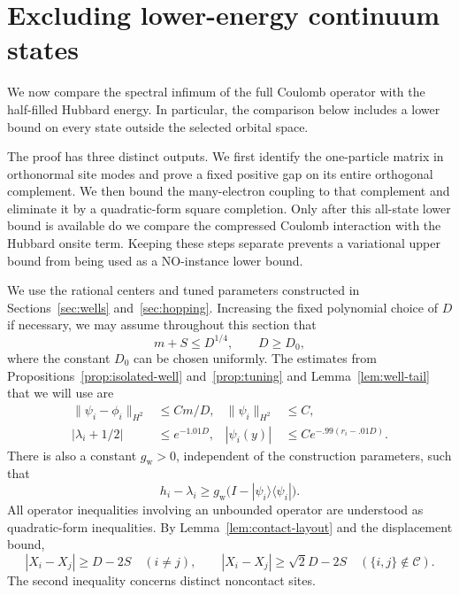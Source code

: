 \section{Excluding lower-energy continuum states}
\label{sec:continuum}

We now compare the spectral infimum of the full Coulomb operator with
the half-filled Hubbard energy.  In particular, the comparison below
includes a lower bound on every state outside the selected orbital
space.

The proof has three distinct outputs. We first identify the one-particle
matrix in orthonormal site modes and prove a fixed positive gap on its
entire orthogonal complement. We then bound the many-electron coupling
to that complement and eliminate it by a quadratic-form square completion.
Only after this all-state lower bound is available do we compare the
compressed Coulomb interaction with the Hubbard onsite term. Keeping
these steps separate prevents a variational upper bound from being used
as a NO-instance lower bound.

We use the rational centers and tuned parameters constructed in
Sections~\ref{sec:wells} and~\ref{sec:hopping}.  Increasing the fixed
polynomial choice of \(D\) if necessary, we may assume throughout this
section that
\[
 m+S\le D^{1/4},\qquad D\ge D_0,
\]
where the constant \(D_0\) can be chosen uniformly.  The estimates from
Propositions~\ref{prop:isolated-well} and~\ref{prop:tuning} and
Lemma~\ref{lem:well-tail} that we will use are
\begin{align}
 \|\psi_i-\phi_i\|_{H^2}&\le C m/D,
 &\|\psi_i\|_{H^2}&\le C, \label{eq:continuum-orbital-input}\\
 |\lambda_i+1/2|&\le e^{-1.01D},
 &|\psi_i(y)|&\le C e^{-.99(r_i-.01D)}. \label{eq:continuum-tail-input}
\end{align}
There is also a constant \(g_{\mathrm w}>0\), independent of the
construction parameters, such that
\begin{equation}
 h_i-\lambda_i\ge
 g_{\mathrm w}\bigl(I-|\psi_i\rangle\langle\psi_i|\bigr).
 \label{eq:continuum-well-gap}
\end{equation}
All operator inequalities involving an unbounded operator are
understood as quadratic-form inequalities.  By
Lemma~\ref{lem:contact-layout} and the displacement bound,
\begin{equation}
 |X_i-X_j|\ge D-2S\quad(i\ne j),\qquad
 |X_i-X_j|\ge\sqrt2D-2S\quad(\{i,j\}\notin\mathcal C).
 \label{eq:continuum-separations}
\end{equation}
The second inequality concerns distinct noncontact sites.

